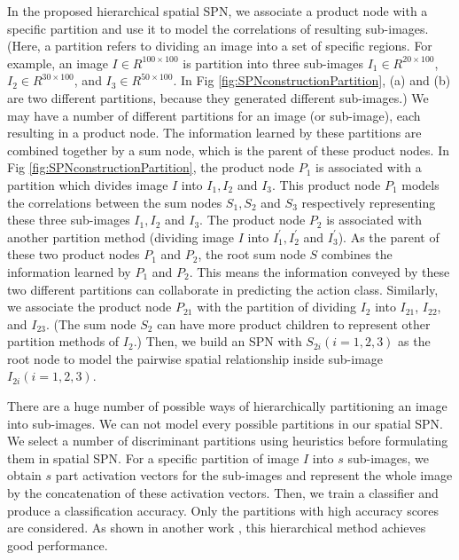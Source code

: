 \documentclass[journal]{IEEEtran}
\begin{document}
In the proposed hierarchical spatial SPN, we associate a product node with a specific partition and use it to model the correlations of resulting sub-images. (Here, a partition refers to dividing an image into a set of specific regions. For example, an image $ I \in R^{100\times100} $ is partition into three sub-images $ I_1 \in R^{20 \times100} $, $ I_2 \in R^{30 \times100} $, and $ I_3 \in R^{50 \times100} $. In Fig \ref{fig:SPNconstructionPartition}, (a) and (b) are two different partitions, because they generated different sub-images.) We may have a number of different partitions for an image (or sub-image), each resulting in a product node.
The information learned by these partitions are combined together by a sum node, which is the parent of  these product nodes.
In Fig \ref{fig:SPNconstructionPartition}, the product node $ P_1 $ is associated with a partition which divides image $ I $ into $ I_1, I_2 $ and $ I_3 $. This product node $ P_1 $ models the correlations between the sum nodes $ S_1, S_2$ and $ S_3 $ respectively representing these three sub-images $ I_1, I_2 $ and $ I_3 $. The product node $ P_2 $ is associated with another partition method (dividing image $ I $ into $ I_1^{'}, I_2^{'} $ and $ I_3^{'} $).
As the parent of these two product nodes $ P_1 $ and $ P_2 $, the root sum node $ S $ combines the information learned by $ P_1 $ and $ P_2 $. This means the information conveyed by these two different partitions can collaborate in predicting the action class. Similarly, we associate the product node $ P_{21} $ with the partition of dividing $ I_2 $ into $ I_{21} $, $ I_{22} $, and $ I_{23} $. (The sum node $ S_2 $ can have more product children to represent other partition methods of $ I_2 $.) Then, we build an SPN with $ S_{2i} (i=1,2,3)$ as the root node to model the pairwise spatial relationship inside sub-image $ I_{2i} (i=1,2,3)$.


There are a huge number of possible ways of hierarchically partitioning an image into sub-images. We can not model every possible partitions in our spatial SPN. We select a number of discriminant partitions using heuristics before formulating them in spatial SPN. For a specific partition of image $ I $ into $ s $ sub-images, we obtain $ s $ part activation vectors for the sub-images and represent the whole image by the concatenation of these activation vectors. Then, we train a classifier and produce a classification accuracy. Only the partitions with high accuracy scores are considered. As shown in another work \cite{Wang2015Video}, this hierarchical method achieves good performance.
\end{document}
